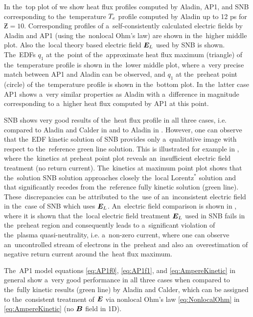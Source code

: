 In the~top plot of  we show heat flux profiles
computed by Aladin, AP1, and SNB corresponding to the~temperature $T_e$ profile 
computed by Aladin up to 12 ps for $\Zbar = 10$. Corresponding profiles of 
a~self-consistently calculated electric fields by Aladin and AP1 
(using the~nonlocal Ohm's law) are shown in the~higher middle plot.
Also the~local theory based electric field $\boldsymbol{E}_L$ used by SNB is shown.
The~EDFs $q_1$ at the~point of the~approximate heat flux maximum (triangle) of
the~temperature profile is shown in the~lower middle plot, 
where a~very precise match between AP1 and Aladin can be observed, 
and $q_1$ at the~preheat point (circle) of the~temperature profile is shown 
in the~bottom plot. In the~latter case
AP1 shows a~very similar properties as Aladin with a~difference in magnitude
corresponding to a~higher heat flux computed by AP1 at this point. 

SNB shows very good results of the~heat flux profile in all three cases, 
i.e. compared to Aladin and Calder in  
and to Aladin in . 
However, one can observe that the~EDF kinetic solution of SNB provides 
only a~qualitative image with respect to the~reference green line solution. 
This is illustrated for example in
, where the~kinetics at preheat point plot 
reveals an~insufficient electric field treatment (no return current). 
The~kinetics at maximum point plot shows that the~solution SNB solution
approaches closely the~local Lorentz$^*$ solution and that 
significantly recedes from the~reference fully kinetic solution (green line).
These~discrepancies can be attributed to the~use of an~inconsistent 
electric field in the~case of SNB which uses $\boldsymbol{E}_L$. An~electric field 
comparison is shown in , where it is shown that 
the~local electric field treatment $\boldsymbol{E}_L$ used in SNB fails 
in the~preheat region and consequently leads to 
a~significant violation of the~plasma quasi-neutrality,
i.e. a~non-zero current, where one can observe an~uncontrolled stream of 
electrons in the~preheat and also an~overestimation of negative return current
around the~heat flux maximum.

The~AP1 model equations \eqref{eq:AP1f0}, \eqref{eq:AP1f1}, 
and \eqref{eq:AmpereKinetic} in general show a~very good performance 
in all three cases when compared to the~fully kinetic results 
(green line) by Aladin and Calder, which can be assigned to the~consistent 
treatment of $\boldsymbol{E}$ via nonlocal Ohm's law \eqref{eq:NonlocalOhm} in
 \eqref{eq:AmpereKinetic} (no $\boldsymbol{B}$ field in 1D).

